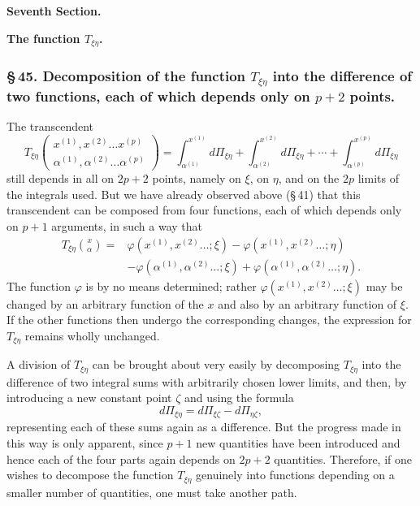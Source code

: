 \documentclass[10pt]{article}
\begin{document}
\begin{center}
{\large\bfseries Seventh Section.}\par\vspace{0.8em}
{\Large\bfseries The function \(T_{\xi\eta}\).}
\end{center}

\subsubsection*{\S\,45. Decomposition of the function \(T_{\xi\eta}\) into the difference of two functions, each of which depends only on \(p+2\) points.}

The transcendent
\[
T_{\xi\eta}\begin{pmatrix}x^{(1)},x^{(2)}\ldots x^{(p)}\\ \alpha^{(1)},\alpha^{(2)}\ldots \alpha^{(p)}\end{pmatrix}
=\int_{\alpha^{(1)}}^{x^{(1)}}d\Pi_{\xi\eta}
+\int_{\alpha^{(2)}}^{x^{(2)}}d\Pi_{\xi\eta}
+\cdots+\int_{\alpha^{(p)}}^{x^{(p)}}d\Pi_{\xi\eta}
\]
still depends in all on \(2p+2\) points, namely on \(\xi\), on \(\eta\), and on the \(2p\) limits of the integrals used. But we have already observed above (\S\,41) that this transcendent can be composed from four functions, each of which depends only on \(p+1\) arguments, in such a way that
\[
\begin{aligned}
T_{\xi\eta}\binom{x}{\alpha}={}&\varphi(x^{(1)},x^{(2)}\ldots;\xi)
-\varphi(x^{(1)},x^{(2)}\ldots;\eta)\\
&-\varphi(\alpha^{(1)},\alpha^{(2)}\ldots;\xi)
+\varphi(\alpha^{(1)},\alpha^{(2)}\ldots;\eta).
\end{aligned}
\]
The function \(\varphi\) is by no means determined; rather \(\varphi(x^{(1)},x^{(2)}\ldots;\xi)\) may be changed by an arbitrary function of the \(x\) and also by an arbitrary function of \(\xi\). If the other functions then undergo the corresponding changes, the expression for \(T_{\xi\eta}\) remains wholly unchanged.

A division of \(T_{\xi\eta}\) can be brought about very easily by decomposing \(T_{\xi\eta}\) into the difference of two integral sums with arbitrarily chosen lower limits, and then, by introducing a new constant point \(\zeta\) and using the formula
\[
d\Pi_{\xi\eta}=d\Pi_{\xi\zeta}-d\Pi_{\eta\zeta},
\]
representing each of these sums again as a difference. But the progress made in this way is only apparent, since \(p+1\) new quantities have been introduced and hence each of the four parts again depends on \(2p+2\) quantities. Therefore, if one wishes to decompose the function \(T_{\xi\eta}\) genuinely into functions depending on a smaller number of quantities, one must take another path.
\end{document}
